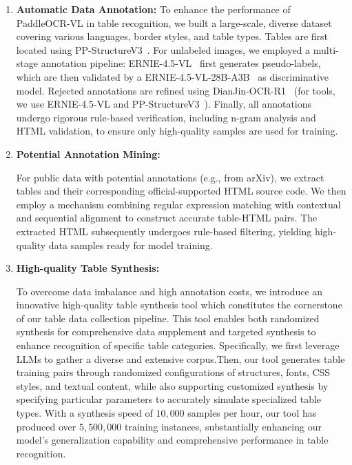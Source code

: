 \documentclass[11pt, a4paper,logo,  copyright, nonumbering]{paddleocr}
\begin{document}
\begin{enumerate}
%
\item \textbf{Automatic Data Annotation:} To enhance the performance of PaddleOCR-VL in table recognition, we built a large-scale, diverse dataset covering various languages, border styles, and table types. Tables are first located using PP-StructureV3~\cite{cui2025paddleocr}. For unlabeled images, we employed a multi-stage annotation pipeline: ERNIE-4.5-VL~\cite{ernie2025technicalreport} first generates pseudo-labels, which are then validated by a ERNIE-4.5-VL-28B-A3B~\cite{ernie2025technicalreport} as discriminative model. Rejected annotations are refined using DianJin-OCR-R1~\cite{chen2025dianjin} (for tools, we use ERNIE-4.5-VL and PP-StructureV3~\cite{cui2025paddleocr}). Finally, all annotations undergo rigorous rule-based verification, including n-gram analysis and HTML validation, to ensure only high-quality samples are used for training.
%
\item \textbf{Potential Annotation Mining:}

For public data with potential annotations (e.g., from arXiv), we extract tables and their corresponding official-supported HTML source code. We then employ a mechanism combining regular expression matching with contextual and sequential alignment to construct accurate table-HTML pairs. The extracted HTML subsequently undergoes rule-based filtering, yielding high-quality data samples ready for model training.
%
\item \textbf{High-quality Table Synthesis:} 

To overcome data imbalance and high annotation costs, we introduce an innovative high-quality table synthesis tool which constitutes the cornerstone of our table data collection pipeline. This tool enables both randomized synthesis for comprehensive data supplement and targeted synthesis to enhance recognition of specific table categories. Specifically, we first leverage LLMs to gather a diverse and extensive corpus.Then, our tool generates table training pairs through randomized configurations of structures, fonts, CSS styles, and textual content, while also supporting customized synthesis by specifying particular parameters to accurately simulate specialized table types. With a synthesis speed of $10,000$ samples per hour, our tool has produced over $5,500,000$ training instances, substantially enhancing our model's generalization capability and comprehensive performance in table recognition.
%
\end{enumerate}
\end{document}
